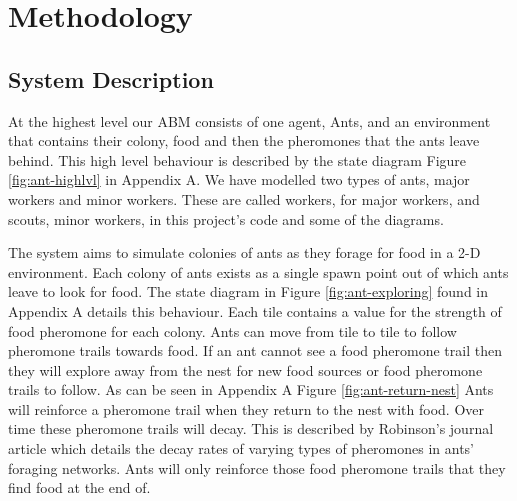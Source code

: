  \section{Methodology}
 
 
 
\subsection{System Description}
 
At the highest level our ABM consists of one agent, Ants, and an environment that contains their colony, food and then the pheromones that the ants leave behind. This high level behaviour is described by the state diagram Figure \ref{fig:ant-highlvl} in Appendix A. We have modelled two types of ants, major workers and minor workers. These are called workers, for major workers, and scouts, minor workers, in this project's code and some of the diagrams.\par
The system aims to simulate colonies of ants as they forage for food in a 2-D environment. Each colony of ants exists as a single spawn point out of which ants leave to look for food. The state diagram in Figure \ref{fig:ant-exploring} found in Appendix A details this behaviour. Each tile contains a value for the strength of food pheromone for each colony. Ants can move from tile to tile to follow pheromone trails towards food. If an ant cannot see a food pheromone trail then they will explore away from the nest for new food sources or food pheromone trails to follow. As can be seen in Appendix A Figure \ref{fig:ant-return-nest} Ants will reinforce a pheromone trail when they return to the nest with food. Over time these pheromone trails will decay. This is described by Robinson's journal article \cite{Robinson2008} which details the decay rates of varying types of pheromones in ants' foraging networks. Ants will only reinforce those food pheromone trails that they find food at the end of.\par

